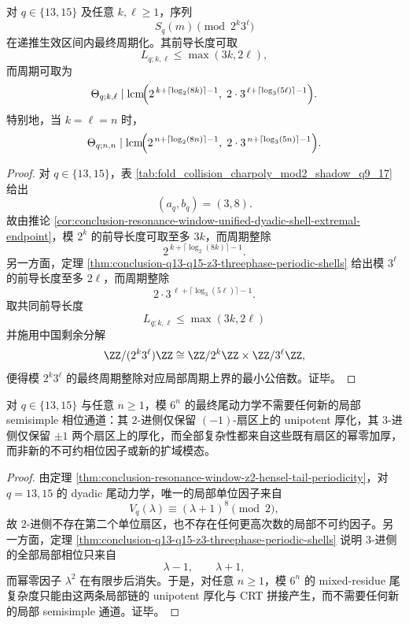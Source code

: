\begin{theorem}[\texorpdfstring{$q=13,15$}{q=13,15} 的混合 \texorpdfstring{$(2^k3^\ell)$}{(2^k3^l)} 周期壳]\label{thm:conclusion-q13-q15-mixed-2k3l-periodic-shells}
对 \(q\in\{13,15\}\) 及任意 \(k,\ell\ge 1\)，序列
\[
S_q(m)\pmod{2^k3^\ell}
\]
在递推生效区间内最终周期化。其前导长度可取
\[
L_{q;k,\ell}\le \max(3k,2\ell),
\]
而周期可取为
\[
\Theta_{q;k,\ell}\mid
\operatorname{lcm}\!\Bigl(
2^{\,k+\lceil\log_2(8k)\rceil-1},
\;
2\cdot 3^{\,\ell+\lceil\log_3(5\ell)\rceil-1}
\Bigr).
\]
特别地，当 \(k=\ell=n\) 时，
\[
\Theta_{q;n,n}\mid
\operatorname{lcm}\!\Bigl(
2^{\,n+\lceil\log_2(8n)\rceil-1},
\;
2\cdot 3^{\,n+\lceil\log_3(5n)\rceil-1}
\Bigr).
\]
\end{theorem}
\begin{proof}
对 \(q\in\{13,15\}\)，表 \ref{tab:fold_collision_charpoly_mod2_shadow_q9_17} 给出
\[
(a_q,b_q)=(3,8).
\]
故由推论 \ref{cor:conclusion-resonance-window-unified-dyadic-shell-extremal-endpoint}，模 \(2^k\) 的前导长度可取至多 \(3k\)，而周期整除
\[
2^{\,k+\lceil\log_2(8k)\rceil-1}.
\]
另一方面，定理 \ref{thm:conclusion-q13-q15-z3-threephase-periodic-shells} 给出模 \(3^\ell\) 的前导长度至多 \(2\ell\)，而周期整除
\[
2\cdot 3^{\,\ell+\lceil\log_3(5\ell)\rceil-1}.
\]
取共同前导长度
\[
L_{q;k,\ell}\le \max(3k,2\ell)
\]
并施用中国剩余分解
\[
\ZZ/(2^k3^\ell)\ZZ
\cong
\ZZ/2^k\ZZ\times \ZZ/3^\ell\ZZ,
\]
便得模 \(2^k3^\ell\) 的最终周期整除对应局部周期上界的最小公倍数。证毕。
\end{proof}

\begin{theorem}[\texorpdfstring{$q=13,15$}{q=13,15} 的局部相位排斥与 mixed-residue 尾复杂度的幂零厚化性]\label{thm:conclusion-q13-q15-local-phase-exclusion-6adic}
对 \(q\in\{13,15\}\) 与任意 \(n\ge 1\)，模 \(6^n\) 的最终尾动力学不需要任何新的局部 semisimple 相位通道：其 \(2\)-进侧仅保留 \((-1)\)-扇区上的 unipotent 厚化，其 \(3\)-进侧仅保留 \(\pm1\) 两个扇区上的厚化，而全部复杂性都来自这些既有扇区的幂零加厚，而非新的不可约相位因子或新的扩域模态。
\end{theorem}
\begin{proof}
由定理 \ref{thm:conclusion-resonance-window-z2-hensel-tail-periodicity}，对 \(q=13,15\) 的 dyadic 尾动力学，唯一的局部单位因子来自
\[
V_q(\lambda)\equiv (\lambda+1)^8\pmod 2,
\]
故 \(2\)-进侧不存在第二个单位扇区，也不存在任何更高次数的局部不可约因子。另一方面，定理 \ref{thm:conclusion-q13-q15-z3-threephase-periodic-shells} 说明 \(3\)-进侧的全部局部相位只来自
\[
\lambda-1,
\qquad
\lambda+1,
\]
而幂零因子 \(\lambda^2\) 在有限步后消失。于是，对任意 \(n\ge 1\)，模 \(6^n\) 的 mixed-residue 尾复杂度只能由这两条局部链的 unipotent 厚化与 CRT 拼接产生，而不需要任何新的局部 semisimple 通道。证毕。
\end{proof}

